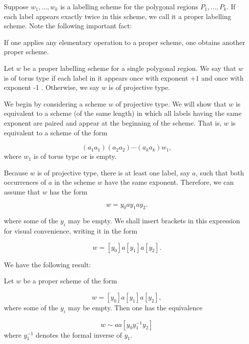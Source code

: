Suppose \(w_{1},\ldots ,w_{k}\) is a labelling scheme for the polygonal regions \(P_{1},\ldots ,P_{k}\). If each label appears exactly twice in this scheme, we call it a proper labelling scheme. Note the following important fact:

If one applies any elementary operation to a proper scheme, one obtains another proper scheme.

\begin{definition}
	Let \(w\) be a proper labelling scheme for a single polygonal region. We say that \(w\) is of torus type if each label in it appears once with exponent \(+ 1\) and once with exponent -1 . Otherwise, we say \(w\) is of projective type.
\end{definition}

We begin by considering a scheme \(w\) of projective type. We will show that \(w\) is equivalent to a scheme (of the same length) in which all labels having the same exponent are paired and appear at the beginning of the scheme. That is, \(w\) is equivalent to a scheme of the form

\[
( {a_{1}a_{1}}) ( {a_{2}a_{2}}) \cdots ( {a_{k}a_{k}}) w_{1},
\]
where \(w_{1}\) is of torus type or is empty.

Because \(w\) is of projective type, there is at least one label, say \(a\), such that both occurrences of \(a\) in the scheme \(w\) have the same exponent. Therefore, we can assume that \(w\) has the form

\[
w = y_{0}ay_{1}ay_{2}.
\]

where some of the \(y_{i}\) may be empty. We shall insert brackets in this expression for visual convenience, writing it in the form

\[
w = [ y_{0}] a[ y_{1}] a[ y_{2}] .
\]

We have the following result:

\begin{lemma}
\label{lem:\thetheorem}
	Let \(w\) be a proper scheme of the form

\[
w = [ y_{0}] a[ y_{1}] a[ y_{2}] ,
\]
where some of the \(y_{i}\) may be empty. Then one has the equivalence

\[
w \sim {aa}[ {y_{0}y_1^{-1}y_{2}}]
\]
where \(y_1^{-1}\) denotes the formal inverse of \(y_{1}\).
\end{lemma}

